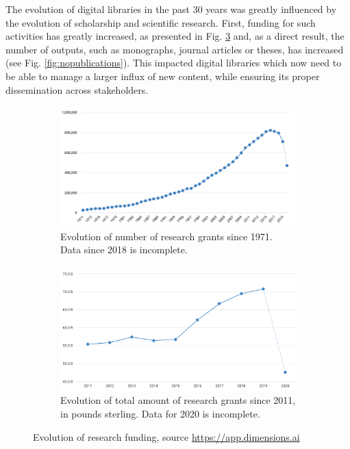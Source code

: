 The evolution of digital libraries in the past 30 years was greatly influenced by the evolution of scholarship and scientific research. First, funding for such activities has greatly increased, as presented in Fig. \ref{fig:fundig} and, as a direct result, the number of outputs, such as monographs, journal articles or theses, has increased (see Fig. \ref{fig:nopublications}). This impacted digital libraries which now need to be able to manage a larger influx of new content, while ensuring its proper dissemination across stakeholders. 
\begin{figure}[ht!]
\centering
\begin{subfigure}{0.9\textwidth}
  \includegraphics[width=1\linewidth]{no_grants.png}  
  \caption{Evolution of number of research grants since 1971. Data since 2018 is incomplete.}
  \label{subfig:grants}
\end{subfigure}
\begin{subfigure}{0.9\textwidth}
  \includegraphics[width=1\linewidth]{funding.png}  
  \caption{Evolution of total amount of research grants since 2011, in pounds sterling. Data for 2020 is incomplete.}
  \label{subfig:grantstotal}
\end{subfigure}
\caption{Evolution of research funding, source \url{https://app.dimensions.ai}}
\label{fig:fundig}
\end{figure}

